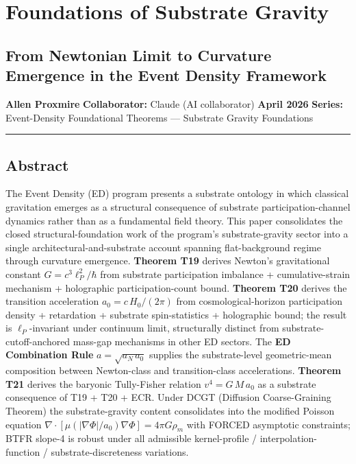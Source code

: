 \documentclass[
]{article}
\author{}
\date{}
\begin{document}
\section{Foundations of Substrate
Gravity}\label{foundations-of-substrate-gravity}

\subsection{From Newtonian Limit to Curvature Emergence in the Event
Density
Framework}\label{from-newtonian-limit-to-curvature-emergence-in-the-event-density-framework}

\textbf{Allen Proxmire} \textbf{Collaborator:} Claude (AI collaborator)
\textbf{April 2026} \textbf{Series:} Event-Density Foundational Theorems
--- Substrate Gravity Foundations

\begin{center}\rule{0.5\linewidth}{0.5pt}\end{center}

\subsection{Abstract}\label{abstract}

The Event Density (ED) program presents a substrate ontology in which
classical gravitation emerges as a structural consequence of substrate
participation-channel dynamics rather than as a fundamental field
theory. This paper consolidates the closed structural-foundation work of
the program's substrate-gravity sector into a single
architectural-and-substrate account spanning flat-background regime
through curvature emergence. \textbf{Theorem T19} derives Newton's
gravitational constant \(G = c^3\ell_P^2/\hbar\) from substrate
participation imbalance + cumulative-strain mechanism + holographic
participation-count bound. \textbf{Theorem T20} derives the transition
acceleration \(a_0 = c\,H_0/(2\pi)\) from cosmological-horizon
participation density + retardation + substrate spin-statistics +
holographic bound; the result is \(\ell_P\)-invariant under continuum
limit, structurally distinct from substrate-cutoff-anchored mass-gap
mechanisms in other ED sectors. The \textbf{ED Combination Rule}
\(a = \sqrt{a_N\,a_0}\) supplies the substrate-level geometric-mean
composition between Newton-class and transition-class accelerations.
\textbf{Theorem T21} derives the baryonic Tully-Fisher relation
\(v^4 = G\,M\,a_0\) as a substrate consequence of T19 + T20 + ECR. Under
DCGT (Diffusion Coarse-Graining Theorem) the substrate-gravity content
consolidates into the modified Poisson equation
\(\nabla\cdot[\mu(|\nabla\Phi|/a_0)\nabla\Phi] = 4\pi G\rho_m\) with
FORCED asymptotic constraints; BTFR slope-4 is robust under all
admissible kernel-profile / interpolation-function /
substrate-discreteness variations.
\end{document}
